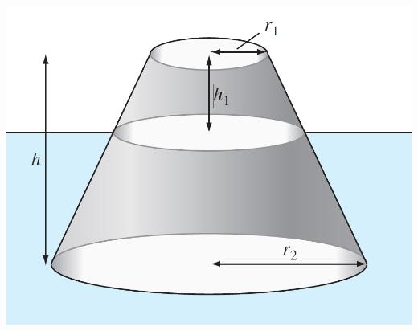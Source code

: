 \documentclass[../main.tex]{subfiles}
\begin{document}
\begin{multicols}{2}
    \noindent
    \begin{minipage}{\linewidth}
        \centering
        \includegraphics[width=0.8\linewidth]{./images/problem_5_9_5}
    \end{minipage}
\end{multicols}
\end{document}
